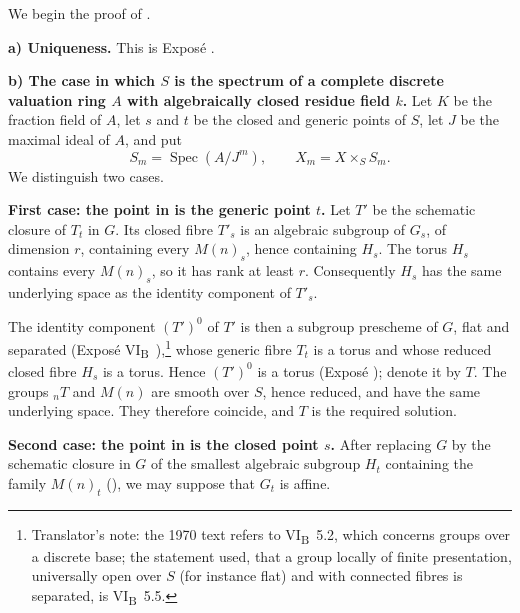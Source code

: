 We begin the proof of .

\medskip\noindent
\textbf{a) Uniqueness.}
This is Exposé .

\medskip\noindent
\textbf{b) The case in which \(S\) is the spectrum of a complete
discrete valuation ring \(A\) with algebraically closed residue field
\(k\).}
Let \(K\) be the fraction field of \(A\), let \(s\) and \(t\) be the
closed and generic points of \(S\), let \(J\) be the maximal ideal of
\(A\), and put
\[
  S_m=\operatorname{Spec}(A/J^m),\qquad X_m=X\times_SS_m.
\]
We distinguish two cases.

\smallskip\noindent
\textbf{First case: the point in  is the generic point
\(t\).}
Let \(T'\) be the schematic closure of \(T_t\) in \(G\). Its closed
fibre \(T'_s\) is an algebraic subgroup of \(G_s\), of dimension
\(r\), containing every \(M(n)_s\), hence containing \(H_s\). The
torus \(H_s\) contains every \(M(n)_s\), so it has rank at least
\(r\). Consequently \(H_s\) has the same underlying space as the
identity component of \(T'_s\).

The identity component \((T')^0\) of \(T'\) is then a subgroup
prescheme of \(G\), flat and separated (Exposé
VI\textsubscript{B}~),\footnote{Translator's note: the 1970 text refers to VI\textsubscript{B}~5.2, which concerns groups over a discrete base; the statement used, that a group locally of finite presentation, universally open over \(S\) (for instance flat) and with connected fibres is separated, is VI\textsubscript{B}~5.5.} whose generic fibre \(T_t\) is a torus and
whose reduced closed fibre \(H_s\) is a torus. Hence \((T')^0\) is a
torus (Exposé ); denote it by \(T\). The groups \({}_nT\) and
\(M(n)\) are smooth over \(S\), hence reduced, and have the same
underlying space. They therefore coincide, and \(T\) is the required
solution.

\smallskip\noindent
\textbf{Second case: the point in  is the closed point
\(s\).}
After replacing \(G\) by the schematic closure in \(G\) of the
smallest algebraic subgroup \(H_t\) containing the family \(M(n)_t\)
(), we may suppose that \(G_t\) is affine.

